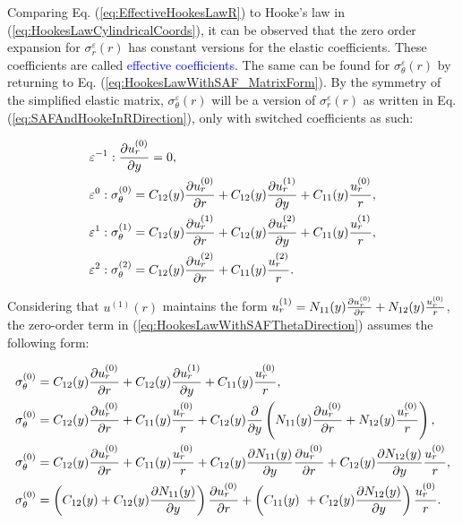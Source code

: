 Comparing Eq. (\ref{eq:EffectiveHookesLawR}) to Hooke's law in (\ref{eq:HookesLawCylindricalCoords}), it can be observed that the zero order expansion for $\sigma_r^{\varepsilon}(r)$ has constant versions for the elastic coefficients. These coefficients are called \textcolor{blue}{effective coefficients}. The same can be found for $\sigma_\theta^{\varepsilon}(r)$ by returning to Eq. (\ref{eq:HookesLawWithSAF_MatrixForm}). By the symmetry of the simplified elastic matrix, $\sigma_\theta^{\varepsilon}(r)$ will be a version of $\sigma_r^{\varepsilon}(r)$ as written in Eq. (\ref{eq:SAFAndHookeInRDirection}), only with switched coefficients as such:

\begin{equation}
    \begin{aligned} \label{eq:HookesLawWithSAFThetaDirection}
        &\varepsilon^{-1}:\frac{\partial u_r^{(0)}}{\partial y} = 0,\\
        &\varepsilon^0:\sigma^{(0)}_\theta = C_{12}(y) \frac{\partial u_r^{(0)}}{\partial r} + C_{12}(y) \frac{\partial u_r^{(1)}}{\partial y} + C_{11}(y)\frac{u_r^{(0)}}{r}, \\
        &\varepsilon^1: \sigma^{(1)}_\theta = C_{12}(y)\frac{\partial u_r^{(1)}}{\partial r} + C_{12}(y)\frac{\partial u_r^{(2)}}{\partial y}+ C_{11}(y)\frac{u_r^{(1)}}{r} , \\
        &\varepsilon^2: \sigma^{(2)}_\theta = C_{12}(y)\frac{\partial u_r^{(2)}}{\partial r} +C_{11}(y) \frac{u_r^{(2)}}{r}.
    \end{aligned}
\end{equation}

Considering that $u^{(1)}(r)$ maintains the form $ u_r^{(1)} = N_{11}(y) \frac{\partial u_r^{(0)}}{\partial r} + N_{12}(y)\frac{u_r^{(0)}}{r} $, the zero-order term in (\ref{eq:HookesLawWithSAFThetaDirection}) assumes the following form:

\begin{equation}
    \begin{aligned} \label{eq:LocalProblemsInSAFStressTheta}
        &\sigma^{(0)}_\theta =  C_{12}(y) \frac{\partial u_r^{(0)}}{\partial r} + C_{12}(y) \frac{\partial u_r^{(1)}}{\partial y} + C_{11}(y)\frac{u_r^{(0)}}{r},\\
       &\sigma^{(0)}_\theta =  C_{12}(y) \frac{\partial u_r^{(0)}}{\partial r} + C_{11}(y)\frac{u_r^{(0)}}{r} + C_{12}(y) \frac{\partial }{\partial y}\left( 
        N_{11}(y) \frac{\partial u_r^{(0)}}{\partial r} + N_{12}(y)\frac{u_r^{(0)}}{r}
       \right),\\
        &\sigma^{(0)}_\theta = C_{12}(y) \frac{\partial u_r^{(0)}}{\partial r} + C_{11}(y)\frac{u_r^{(0)}}{r} + C_{12}(y) \frac{\partial N_{11}(y)}{\partial y}\frac{\partial u_r^{(0)}}{\partial r} + C_{12}(y)\frac{\partial N_{12}(y)}{\partial y}\frac{u_r^{(0)}}{r},\\
        &\sigma^{(0)}_\theta = \left( C_{12}(y) + C_{12}(y) \frac{\partial N_{11}(y)}{\partial y}\right)\frac{\partial u_r^{(0)}}{\partial r} + \left(C_{11}(y)\ + C_{12}(y)\frac{\partial N_{12}(y)}{\partial y}\right)\frac{u_r^{(0)}}{r}.\\
    \end{aligned}
\end{equation}

